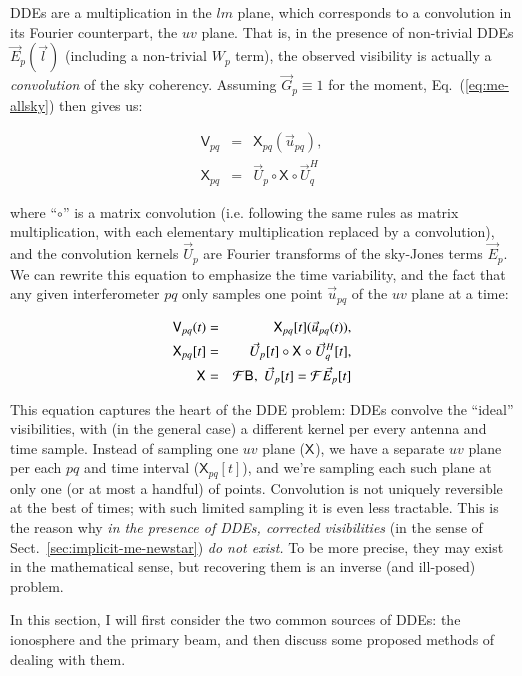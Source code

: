 \documentclass{aa}
\newcommand{\herm}{H}
\newcommand{\jones}[2]{\vec {#1}_{#2}}
\newcommand{\jonesT}[2]{\vec {#1}^{\herm}_{#2}}
\newcommand{\coh}[2]{\mathsf{{#1}}_{{#2}}}
\begin{document}
DDEs are a multiplication in the $lm$ plane, which corresponds to a convolution in its Fourier counterpart, the $uv$ plane. That is, in the presence of non-trivial DDEs $\jones{E}{p}(\vec l)$ (including a non-trivial $W_p$ term), the observed visibility is actually a \emph{convolution} of the sky coherency. Assuming $\jones{G}{p}\equiv1$ for the moment, Eq.~(\ref{eq:me-allsky}) then gives us:

\begin{eqnarray}\label{eq:dde-convolution}
\nonumber \coh{V}{pq} & = & \coh{X}{pq}(\vec u_{pq}), \\
\coh{X}{pq} &=& \jones{U}{p} \circ \coh{X}{} \circ \jonesT{U}{q}
\end{eqnarray}

where ``$\circ$'' is a matrix convolution (i.e. following the same rules as matrix multiplication, with each elementary multiplication replaced by a convolution), and the convolution kernels $\jones{U}{p}$ are Fourier transforms of the
sky-Jones terms $\jones{E}{p}$. We can rewrite this equation to emphasize the time variability, and the fact that any given interferometer $pq$ only samples one point $\vec u_{pq}$ of the $uv$ plane at a time:

\begin{eqnarray}\label{eq:dde-convolution-t}
\coh{V}{pq}(t) & = & \coh{X}{pq}[t](\vec u_{pq}(t)), \\
\nonumber \coh{X}{pq}[t] & = & \jones{U}{p}[t] \circ \coh{X}{} \circ \jonesT{U}{q}[t], \\
\nonumber \coh{X}{} & = & {\cal F} \coh{B}{}, \; \jones{U}{p}[t] = {\cal F}\jones{E}{p}[t]
\end{eqnarray}

This equation captures the heart of the DDE problem: DDEs convolve the ``ideal'' visibilities, with (in the general case) a different kernel per every antenna and time sample. Instead of sampling one $uv$ plane ($\coh{X}{}$), we have a separate $uv$ plane per each $pq$ and time interval ($\coh{X}{pq}[t]$), and we're sampling each such plane at only one (or at most a handful) of points. Convolution is not uniquely reversible at the best of times; with such limited sampling it is even less tractable. This is the reason why \emph{in the presence of DDEs, corrected visibilities} (in the sense of Sect.~\ref{sec:implicit-me-newstar}) \emph{do not exist.} To be more precise, they may exist in the mathematical sense, but recovering them is an inverse (and ill-posed) problem.

In this section, I will first consider the two common sources of DDEs: the ionosphere and the primary beam, and
then discuss some proposed methods of dealing with them.
\end{document}
